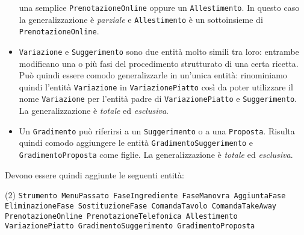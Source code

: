 \begin{itemize}
    una semplice {\tt PrenotazioneOnline} oppure un {\tt Allestimento}.
    In questo caso la generalizzazione è {\it parziale} e {\tt Allestimento}
    è un sottoinsieme di {\tt PrenotazioneOnline}.
\item {\tt Variazione} e {\tt Suggerimento} sono due entità molto simili tra loro: entrambe
    modificano una o più fasi del procedimento strutturato di una certa ricetta. Può quindi
    essere comodo generalizzarle in un'unica entità: rinominiamo quindi l'entità {\tt Variazione}
    in {\tt VariazionePiatto} così da poter utilizzare il nome {\tt Variazione} per l'entità
    padre di {\tt VariazionePiatto} e {\tt Suggerimento}. La generalizzazione è {\it totale}
    ed {\it esclusiva}.
\item Un {\tt Gradimento} può riferirsi a un {\tt Suggerimento} o a una {\tt Proposta}.
    Risulta quindi comodo aggiungere le entità {\tt GradimentoSuggerimento} e
    {\tt GradimentoProposta} come figlie. La generalizzazione è {\it totale} ed
    {\it esclusiva}.
\end{itemize}

Devono essere quindi aggiunte le seguenti entità:
\begin{tasks}[label=\textbullet](2)
    \task\tt Strumento
    \task\tt MenuPassato
    \task\tt FaseIngrediente
    \task\tt FaseManovra
    \task\tt AggiuntaFase
    \task\tt EliminazioneFase
    \task\tt SostituzioneFase
    \task\tt ComandaTavolo
    \task\tt ComandaTakeAway
    \task\tt PrenotazioneOnline
    \task\tt PrenotazioneTelefonica
    \task\tt Allestimento
    \task\tt VariazionePiatto
    \task\tt GradimentoSuggerimento
    \task\tt GradimentoProposta
\end{tasks}
